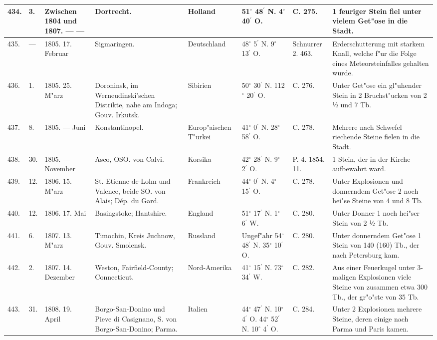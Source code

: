 \documentclass[a4paper, 8pt, oneside, polutonikogreek, german]{article}
\begin{document}
\begin{center}
\begin{longtable}{| p{5mm} | p{3mm} | p{15mm} | p{25mm} | p{20mm} | p{14mm} | p{17mm} | p{24mm} |}
        434. & 3. & Zwischen 1804 und 1807. --- --- & Dortrecht. & Holland & 51$^\circ$ 48$^\prime$ N. 4$^\circ$ 40$^\prime$ O. & C. 275. & 1 feuriger Stein fiel unter vielem Get"ose in die Stadt. \\ \hline
        435. & --- & 1805. 17. Februar & Sigmaringen. & Deutschland & 48$^\circ$ 5$^\prime$ N. 9$^\circ$ 13$^\prime$ O. & Schnurrer 2. 463. & Erderschutterung mit starkem Knall, welche f"ur die Folge eines Meteorsteinfalles gehalten wurde. \\ \hline
        436. & 1. & 1805. 25. M"arz & Doroninsk, im Werneudinski’schen Distrikte, nahe am Indoga; Gouv. Irkutsk. & Sibirien & 50$^\circ$ 30$^\prime$ N. 112$^\circ$ 20$^\prime$ O. & C. 276. & Unter Get"ose ein gl"uhender Stein in 2 Bruchst"ucken von 2 ½ und 7 Tb. \\ \hline
        437. & 8. & 1805. --- Juni & Konstantinopel. & Europ"aischen T"urkei & 41$^\circ$ 0$^\prime$ N. 28$^\circ$ 58$^\prime$ O. & C. 278. & Mehrere nach Schwefel riechende Steine fielen in die Stadt. \\ \hline
        438. & 30. & 1805. --- November & Asco, OSO. von Calvi. & Korsika & 42$^\circ$ 28$^\prime$ N. 9$^\circ$ 2$^\prime$ O. & P. 4. 1854. 11. & 1 Stein, der in der Kirche aufbewahrt ward. \\ \hline
        439. & 12. & 1806. 15. M"arz & St. Etienne-de-Lolm und Valence, beide SO. von Alais; Dép. du Gard. & Frankreich & 44$^\circ$ 0$^\prime$ N. 4$^\circ$ 15$^\prime$ O. & C. 278. & Unter Explosionen und donnerndem Get"ose 2 noch hei"se Steine von 4 und 8 Tb. \\ \hline
        440. & 12. & 1806. 17. Mai & Basingstoke; Hantshire. & England & 51$^\circ$ 17$^\prime$ N. 1$^\circ$ 6$^\prime$ W. & C. 280. & Unter Donner 1 noch hei"ser Stein von 2 ½ Tb. \\ \hline
        441. & 6. & 1807. 13. M"arz & Timochin, Kreis Juchnow, Gouv. Smolensk. & Russland & Ungef"ahr 54$^\circ$ 48$^\prime$ N. 35$^\circ$ 10$^\prime$ O. & C. 280. & Unter donnerndem Get"ose 1 Stein von 140 (160) Tb., der nach Petersburg kam. \\ \hline
        442. & 2. & 1807. 14. Dezember & Weston, Fairfield-County; Connecticut. & Nord-Amerika & 41$^\circ$ 15$^\prime$ N. 73$^\circ$ 34$^\prime$ W. & C. 282. & Aus einer Feuerkugel unter 3-maligen Explosionen viele Steine von zusammen etwa 300 Tb., der gr"o"ste von 35 Tb. \\ \hline
        443. & 31. & 1808. 19. April & Borgo-San-Donino und Pieve di Casignano, S. von Borgo-San-Donino; Parma. & Italien & 44$^\circ$ 47$^\prime$ N. 10$^\circ$ 4$^\prime$ O. 44$^\circ$ 52$^\prime$ N. 10$^\circ$ 4$^\prime$ O. & C. 284. & Unter 2 Explosionen mehrere Steine, deren einige nach Parma und Paris kamen. \\ \hline

\end{longtable}
\end{center}
\end{document}

